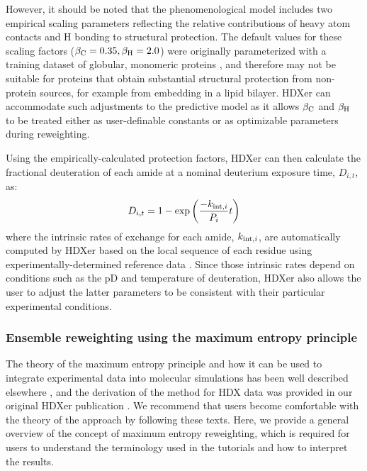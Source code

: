 \documentclass[9pt,tutorial]{livecoms}
\begin{document}
However, it should be noted that the phenomenological model includes two empirical scaling parameters reflecting the relative contributions of heavy atom contacts and H bonding to structural protection.
The default values for these scaling factors ($\beta_\textnormal{C} = 0.35, \beta_\textnormal{H} = 2.0$) were originally parameterized with a training dataset of globular, monomeric proteins \cite{BestVendruscolo2006}, and therefore may not be suitable for proteins that obtain substantial structural protection from non-protein sources, for example from embedding in a lipid bilayer.
HDXer can accommodate such adjustments to the predictive model as it allows $\beta_\textnormal{C}$ and $\beta_\textnormal{H}$ to be treated either as user-definable constants or as optimizable parameters during reweighting.

Using the empirically-calculated protection factors, HDXer can then calculate the fractional deuteration of each amide at a nominal deuterium exposure time, $D_{i,t}$, as:
\begin{equation}\label{Df_eqn}
    D_{i,t} = 1 - \exp\left( \frac{-k_{\textnormal{int},i}}{P_i}t \right)
\end{equation}
where the intrinsic rates of exchange for each amide, $k_{\textnormal{int},i}$, are automatically computed by HDXer based on the local sequence of each residue using experimentally-determined reference data \cite{Bai1993, Nguyen2018}. 
Since those intrinsic rates depend on conditions such as the pD and temperature of deuteration, HDXer also allows the user to adjust the latter parameters to be consistent with their particular experimental conditions.

\subsubsection{Ensemble reweighting using the maximum entropy principle}\label{maxent_theory_sect}
The theory of the maximum entropy principle and how it can be used to integrate experimental data into molecular simulations has been well described elsewhere \cite{Pitera2012, Boomsma2014, Marinelli2019, Hummer2015}, and the derivation of the method for HDX data was provided in our original HDXer publication \cite{Bradshaw2020}.
We recommend that users become comfortable with the theory of the approach by following these texts. 
Here, we provide a general overview of the concept of maximum entropy reweighting, which is required for users to understand the terminology used in the tutorials and how to interpret the results.
\end{document}
